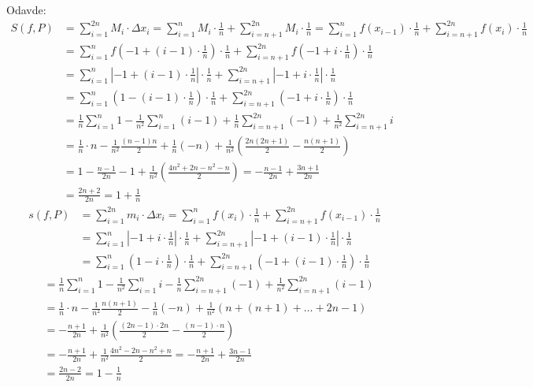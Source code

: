 \documentclass[a4paper,12pt,twoside]{report}
\numberwithin{algorithm}{section}
\begin{document}
Odavde:
\begin{align*}
    S(f, P) &= \sum_{i=1}^{2n} M_i \cdot \Delta x_i = \sum_{i=1}^{n} M_i \cdot \frac{1}{n} + \sum_{i=n+1}^{2n} M_i \cdot \frac{1}{n} = \sum_{i=1}^{n} f(x_{i-1}) \cdot \frac{1}{n} + \sum_{i=n+1}^{2n} f(x_i) \cdot \frac{1}{n} \\
    &= \sum_{i=1}^{n} f\left(-1 + (i-1) \cdot \frac{1}{n}\right) \cdot \frac{1}{n} + \sum_{i=n+1}^{2n} f\left(-1 + i \cdot \frac{1}{n}\right) \cdot \frac{1}{n} \\
    &= \sum_{i=1}^{n} \left| -1 + (i-1) \cdot \frac{1}{n} \right| \cdot \frac{1}{n} + \sum_{i=n+1}^{2n} \left| -1 + i \cdot \frac{1}{n} \right| \cdot \frac{1}{n} \\
    &= \sum_{i=1}^{n} \left( 1 - (i-1) \cdot \frac{1}{n} \right) \cdot \frac{1}{n} + \sum_{i=n+1}^{2n} \left( -1 + i \cdot \frac{1}{n} \right) \cdot \frac{1}{n} \\
    &= \frac{1}{n} \sum_{i=1}^{n} 1 - \frac{1}{n^2} \sum_{i=1}^{n} (i-1) + \frac{1}{n} \sum_{i=n+1}^{2n} (-1) + \frac{1}{n^2} \sum_{i=n+1}^{2n} i \\
    &= \frac{1}{n} \cdot n - \frac{1}{n^2} \frac{(n-1)n}{2} + \frac{1}{n} (-n) + \frac{1}{n^2} \left( \frac{2n(2n+1)}{2} - \frac{n(n+1)}{2} \right) \\
    &= 1 - \frac{n-1}{2n} - 1 + \frac{1}{n^2} \left( \frac{4n^2 + 2n - n^2 - n}{2} \right) = - \frac{n-1}{2n} + \frac{3n+1}{2n} \\
    &= \frac{2n+2}{2n} = 1 + \frac{1}{n}
\end{align*}
\begin{align*}
    s(f, P) &= \sum_{i=1}^{2n} m_i \cdot \Delta x_i = \sum_{i=1}^{n} f(x_i) \cdot \frac{1}{n} + \sum_{i=n+1}^{2n} f(x_{i-1}) \cdot \frac{1}{n} \\
    &= \sum_{i=1}^{n} \left| -1 + i \cdot \frac{1}{n} \right| \cdot \frac{1}{n} + \sum_{i=n+1}^{2n} \left| -1 + (i-1) \cdot \frac{1}{n} \right| \cdot \frac{1}{n} \\
    &= \sum_{i=1}^{n} \left( 1 - i \cdot \frac{1}{n} \right) \cdot \frac{1}{n} + \sum_{i=n+1}^{2n} \left( -1 + (i-1) \cdot \frac{1}{n} \right) \cdot \frac{1}{n}
\end{align*}
\begin{align*}
    &= \frac{1}{n} \sum_{i=1}^{n} 1 - \frac{1}{n^2} \sum_{i=1}^{n} i - \frac{1}{n} \sum_{i=n+1}^{2n} (-1) + \frac{1}{n^2} \sum_{i=n+1}^{2n} (i-1) \\
    &= \frac{1}{n} \cdot n - \frac{1}{n^2} \frac{n(n+1)}{2} - \frac{1}{n} (-n) + \frac{1}{n^2} (n + (n+1) + \dots + 2n - 1) \\
    &= - \frac{n+1}{2n} + \frac{1}{n^2} \left( \frac{(2n-1) \cdot 2n}{2} - \frac{(n-1) \cdot n}{2} \right) \\
    &= - \frac{n+1}{2n} + \frac{1}{n^2} \frac{4n^2 - 2n - n^2 + n}{2} = - \frac{n+1}{2n} + \frac{3n-1}{2n} \\
    &= \frac{2n-2}{2n} = 1 - \frac{1}{n}
\end{align*}
\end{document}
